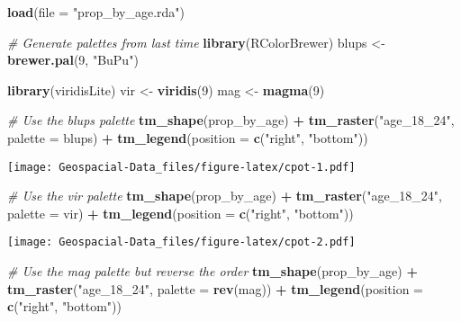 \documentclass[]{article}
\newenvironment{Shaded}{\begin{snugshade}}{\end{snugshade}}
\newcommand{\CommentTok}[1]{\textcolor[rgb]{0.56,0.35,0.01}{\textit{#1}}}
\newcommand{\DataTypeTok}[1]{\textcolor[rgb]{0.13,0.29,0.53}{#1}}
\newcommand{\DecValTok}[1]{\textcolor[rgb]{0.00,0.00,0.81}{#1}}
\newcommand{\KeywordTok}[1]{\textcolor[rgb]{0.13,0.29,0.53}{\textbf{#1}}}
\newcommand{\NormalTok}[1]{#1}
\newcommand{\OperatorTok}[1]{\textcolor[rgb]{0.81,0.36,0.00}{\textbf{#1}}}
\newcommand{\StringTok}[1]{\textcolor[rgb]{0.31,0.60,0.02}{#1}}
\begin{document}
\begin{Shaded}
\begin{Highlighting}[]
\KeywordTok{load}\NormalTok{(}\DataTypeTok{file =} \StringTok{"prop_by_age.rda"}\NormalTok{)}

\CommentTok{# Generate palettes from last time}
\KeywordTok{library}\NormalTok{(RColorBrewer)}
\NormalTok{blups <-}\StringTok{ }\KeywordTok{brewer.pal}\NormalTok{(}\DecValTok{9}\NormalTok{, }\StringTok{"BuPu"}\NormalTok{)}

\KeywordTok{library}\NormalTok{(viridisLite)}
\NormalTok{vir <-}\StringTok{ }\KeywordTok{viridis}\NormalTok{(}\DecValTok{9}\NormalTok{)}
\NormalTok{mag <-}\StringTok{ }\KeywordTok{magma}\NormalTok{(}\DecValTok{9}\NormalTok{)}

\CommentTok{# Use the blups palette}
\KeywordTok{tm_shape}\NormalTok{(prop_by_age) }\OperatorTok{+}
\StringTok{  }\KeywordTok{tm_raster}\NormalTok{(}\StringTok{"age_18_24"}\NormalTok{, }\DataTypeTok{palette =}\NormalTok{ blups) }\OperatorTok{+}
\StringTok{  }\KeywordTok{tm_legend}\NormalTok{(}\DataTypeTok{position =} \KeywordTok{c}\NormalTok{(}\StringTok{"right"}\NormalTok{, }\StringTok{"bottom"}\NormalTok{))}
\end{Highlighting}
\end{Shaded}

\texttt{[image: Geospacial-Data\_files/figure-latex/cpot-1.pdf]}

\begin{Shaded}
\begin{Highlighting}[]
\CommentTok{# Use the vir palette}
\KeywordTok{tm_shape}\NormalTok{(prop_by_age) }\OperatorTok{+}
\StringTok{  }\KeywordTok{tm_raster}\NormalTok{(}\StringTok{"age_18_24"}\NormalTok{, }\DataTypeTok{palette =}\NormalTok{ vir) }\OperatorTok{+}
\StringTok{  }\KeywordTok{tm_legend}\NormalTok{(}\DataTypeTok{position =} \KeywordTok{c}\NormalTok{(}\StringTok{"right"}\NormalTok{, }\StringTok{"bottom"}\NormalTok{))}
\end{Highlighting}
\end{Shaded}

\texttt{[image: Geospacial-Data\_files/figure-latex/cpot-2.pdf]}

\begin{Shaded}
\begin{Highlighting}[]
\CommentTok{# Use the mag palette but reverse the order}
\KeywordTok{tm_shape}\NormalTok{(prop_by_age) }\OperatorTok{+}
\StringTok{  }\KeywordTok{tm_raster}\NormalTok{(}\StringTok{"age_18_24"}\NormalTok{, }\DataTypeTok{palette =} \KeywordTok{rev}\NormalTok{(mag)) }\OperatorTok{+}
\StringTok{  }\KeywordTok{tm_legend}\NormalTok{(}\DataTypeTok{position =} \KeywordTok{c}\NormalTok{(}\StringTok{"right"}\NormalTok{, }\StringTok{"bottom"}\NormalTok{))}
\end{Highlighting}
\end{Shaded}
\end{document}
